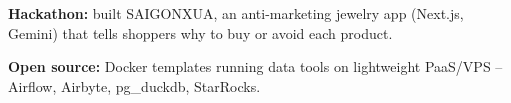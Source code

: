 
\vspace{3pt}
\begin{resume_list}
  \item \textbf{Hackathon:} built SAIGONXUA, an anti-marketing jewelry app (Next.js, Gemini) that tells shoppers why to buy or avoid each product.
  \item \textbf{Open source:} Docker templates running data tools on lightweight PaaS/VPS -- Airflow, Airbyte, pg\_duckdb, StarRocks.
\end{resume_list}

